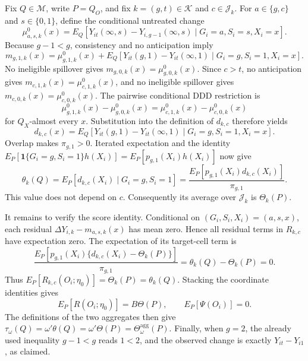 Fix \(Q\in\mathcal M\), write \(P=Q_O\), and fix \(k=(g,t)\in\mathcal K\) and \(c\in\mathcal J_k\).  For \(a\in\{g,c\}\) and \(s\in\{0,1\}\), define the conditional untreated change
\[
 \mu^0_{a,s,k}(x)
 =E_Q\!\left[Y_{it}(\infty,s)-Y_{i,g-1}(\infty,s)
       \mid G_i=a,S_i=s,X_i=x\right].
\]
Because \(g-1<g\), consistency and no anticipation imply
\[
 m_{g,1,k}(x)
 =\mu^0_{g,1,k}(x)
  +E_Q\!\left[Y_{it}(g,1)-Y_{it}(\infty,1)
       \mid G_i=g,S_i=1,X_i=x\right].
\]
No ineligible spillover gives \(m_{g,0,k}(x)=\mu^0_{g,0,k}(x)\).  Since \(c>t\), no anticipation gives \(m_{c,1,k}(x)=\mu^0_{c,1,k}(x)\), and no ineligible spillover gives \(m_{c,0,k}(x)=\mu^0_{c,0,k}(x)\).  The pairwise conditional DDD restriction is
\[
 \mu^0_{g,1,k}(x)-\mu^0_{g,0,k}(x)
 =\mu^0_{c,1,k}(x)-\mu^0_{c,0,k}(x)
\]
for \(Q_X\)-almost every \(x\).  Substitution into the definition of \(d_{k,c}\) therefore yields
\[
 d_{k,c}(x)
 =E_Q\!\left[Y_{it}(g,1)-Y_{it}(\infty,1)
       \mid G_i=g,S_i=1,X_i=x\right].
\]
Overlap makes \(\pi_{g,1}>0\).  Iterated expectation and the identity
\(E_P[\mathbf 1\{G_i=g,S_i=1\}h(X_i)]=E_P[p_{g,1}(X_i)h(X_i)]\) now give
\[
 \theta_k(Q)
 =E_P[d_{k,c}(X_i)\mid G_i=g,S_i=1]
 =\frac{E_P[p_{g,1}(X_i)d_{k,c}(X_i)]}{\pi_{g,1}}.
\]
This value does not depend on \(c\).  Consequently its average over \(\mathcal J_k\) is \(\Theta_k(P)\).

It remains to verify the score identity.  Conditional on \((G_i,S_i,X_i)=(a,s,x)\), each residual \(\Delta Y_{i,k}-m_{a,s,k}(x)\) has mean zero.  Hence all residual terms in \(R_{k,c}\) have expectation zero.  The expectation of its target-cell term is
\[
 \frac{E_P[p_{g,1}(X_i)\{d_{k,c}(X_i)-\Theta_k(P)\}]}{\pi_{g,1}}
 =\theta_k(Q)-\Theta_k(P)=0.
\]
Thus \(E_P[R_{k,c}(O_i;\eta_0)]=\Theta_k(P)=\theta_k(Q)\).  Stacking the coordinate identities gives
\[
 E_P[R(O_i;\eta_0)]=B\Theta(P),\qquad
 E_P[\Psi(O_i)]=0.
\]
The definitions of the two aggregates then give \(\tau_\omega(Q)=\omega'\theta(Q)=\omega'\Theta(P)=\Theta_\omega^{\mathrm{agg}}(P)\).  Finally, when \(g=2\), the already used inequality \(g-1<g\) reads \(1<2\), and the observed change is exactly \(Y_{it}-Y_{i1}\), as claimed.